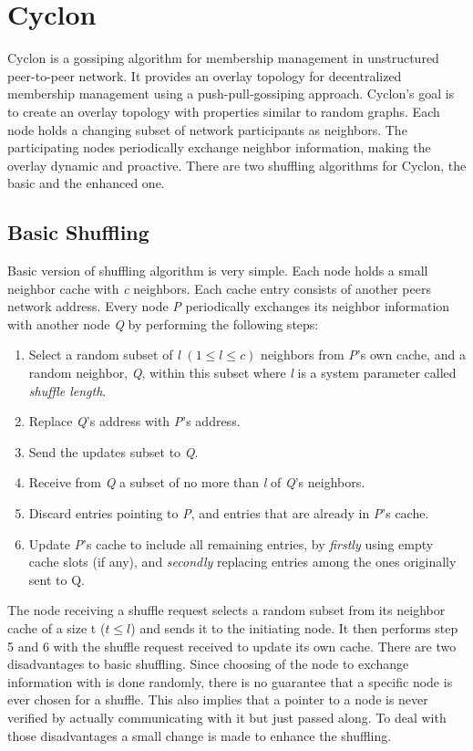 \section{Cyclon} 
Cyclon \cite{voulgaris2005cyclon} is a gossiping algorithm for membership
management in unstructured peer-to-peer network. It provides an overlay topology
for decentralized membership management using a push-pull-gossiping approach. Cyclon's goal is to
create an overlay topology with properties similar to random graphs. Each node
holds a changing subset of network participants as neighbors. The
participating nodes periodically exchange neighbor information, making the
overlay dynamic and proactive.  There are two shuffling algorithms for Cyclon, the basic and the
enhanced one.
\subsection{Basic Shuffling}
Basic version of shuffling algorithm is very simple. Each node holds a small
neighbor cache with \emph{c} neighbors. Each cache entry consists of another
peers network address. Every node \emph{P} periodically exchanges its neighbor
information with another node \emph{Q} by performing the following steps:
\begin{enumerate}
\item Select a random subset of \emph{l} $(1 \leq l \leq c)$ neighbors from
\emph{P}'s own cache, and a random neighbor, \emph{Q}, within this subset where
\emph{l} is a system parameter called \emph{shuffle length}.
\item Replace \emph{Q}'s address with \emph{P}'s address.
\item Send the updates subset to \emph{Q}.
\item Receive from \emph{Q} a subset of no more than \emph{l} of \emph{Q}'s
neighbors.
\item Discard entries pointing to \emph{P}, and entries that are already in
\emph{P}'s cache.
\item Update \emph{P}'s cache to include all remaining entries, by
\emph{firstly} using empty cache slots (if any), and \emph{secondly} replacing
entries among the ones originally sent to Q.
\end{enumerate}
The node receiving a shuffle request selects a random subset from its neighbor
cache of a size t ($t \leq l$) and sends it to the initiating node. It then
performs step 5 and 6 with the shuffle request received to update its own cache.
There are two disadvantages to basic shuffling. Since choosing of the node
to exchange information with is done randomly, there is no guarantee that a
specific node is ever chosen for a shuffle. This also implies that a pointer to
a node is never verified by actually communicating with it but just passed along. To deal
with those disadvantages a small change is made to enhance the shuffling.
 
